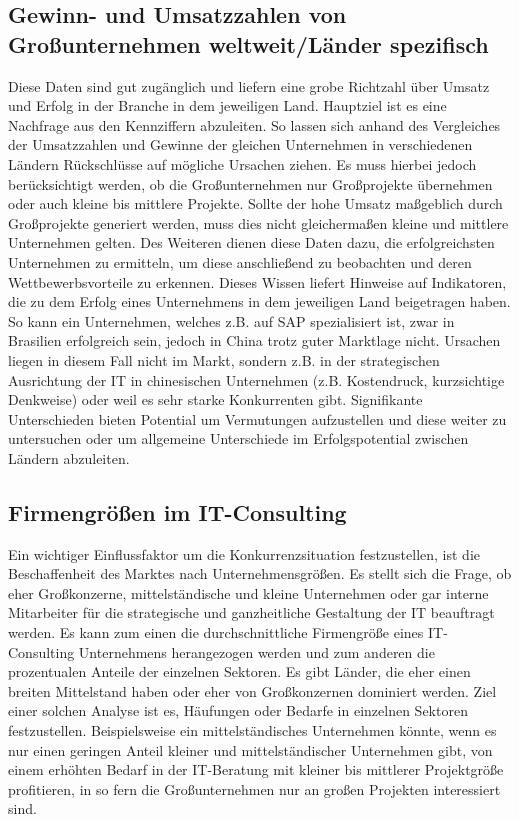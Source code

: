 \subsection*{Gewinn- und Umsatzzahlen von Großunternehmen weltweit/Länder spezifisch}
Diese Daten sind gut zugänglich und liefern eine grobe Richtzahl über Umsatz und Erfolg in der Branche in dem jeweiligen Land. Hauptziel ist es eine Nachfrage aus den Kennziffern abzuleiten. So lassen sich anhand des Vergleiches der Umsatzzahlen und Gewinne der gleichen Unternehmen in verschiedenen Ländern Rückschlüsse auf mögliche Ursachen ziehen.
 Es muss hierbei jedoch berücksichtigt werden, ob die Großunternehmen nur Großprojekte übernehmen oder auch kleine bis mittlere Projekte. Sollte der hohe Umsatz maßgeblich durch Großprojekte generiert werden, muss dies nicht gleichermaßen kleine und mittlere Unternehmen gelten.
Des Weiteren dienen diese Daten dazu, die erfolgreichsten Unternehmen zu ermitteln, um diese anschließend zu beobachten und deren Wettbewerbsvorteile zu erkennen. Dieses Wissen liefert Hinweise auf Indikatoren, die zu dem Erfolg eines Unternehmens in dem jeweiligen Land beigetragen haben.
 So kann ein Unternehmen, welches z.B. auf SAP spezialisiert ist, zwar in Brasilien erfolgreich sein, jedoch in China trotz guter Marktlage nicht. Ursachen liegen in diesem Fall nicht im Markt, sondern z.B. in der strategischen Ausrichtung der IT in chinesischen Unternehmen (z.B. Kostendruck, kurzsichtige Denkweise) oder weil es sehr starke Konkurrenten gibt.
Signifikante Unterschieden bieten Potential um Vermutungen aufzustellen und diese weiter zu untersuchen oder um allgemeine Unterschiede im Erfolgspotential zwischen Ländern abzuleiten. 

 \subsection*{Firmengrößen im IT-Consulting}
Ein wichtiger Einflussfaktor um die Konkurrenzsituation festzustellen, ist die Beschaffenheit des Marktes nach Unternehmensgrößen.
 Es stellt sich die Frage, ob eher Großkonzerne, mittelständische und kleine  Unternehmen oder gar interne Mitarbeiter für die strategische und ganzheitliche Gestaltung der IT beauftragt werden.
Es kann zum einen die durchschnittliche Firmengröße eines IT-Consulting Unternehmens herangezogen werden  und zum anderen die prozentualen Anteile der einzelnen Sektoren.  Es gibt Länder, die eher einen breiten Mittelstand haben oder eher von Großkonzernen dominiert werden. 
Ziel einer solchen Analyse ist es, Häufungen oder Bedarfe in einzelnen Sektoren festzustellen. 
Beispielsweise ein mittelständisches Unternehmen könnte, wenn es nur einen geringen Anteil kleiner und mittelständischer Unternehmen gibt, von einem erhöhten Bedarf in der IT-Beratung mit kleiner bis mittlerer Projektgröße profitieren, in so fern die Großunternehmen nur an großen Projekten interessiert sind.

